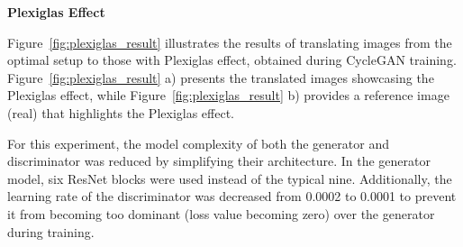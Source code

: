 \documentclass[12pt,DIV14,BCOR12mm,a4paper,footinclude=false,headinclude,parskip=half-,twoside,openright,cleardoublepage=empty,toc=index,bibliography=totoc,listof=totoc]{scrreprt}
\numberwithin{equation}{chapter}
\begin{document}
\textbf{Plexiglas Effect}

Figure~\ref{fig:plexiglas_result} illustrates the results of translating images from the optimal setup to those with Plexiglas effect, obtained during CycleGAN training. Figure~\ref{fig:plexiglas_result} a) presents the translated images showcasing the Plexiglas effect, while Figure~\ref{fig:plexiglas_result} b) provides a reference image (real) that highlights the Plexiglas effect. 

For this experiment, the model complexity of both the generator and discriminator was reduced by simplifying their architecture. In the generator model, six ResNet blocks were used instead of the typical nine. Additionally, the learning rate of the discriminator was decreased from 0.0002 to 0.0001 to prevent it from becoming too dominant (loss value becoming zero) over the generator during training.
\end{document}
